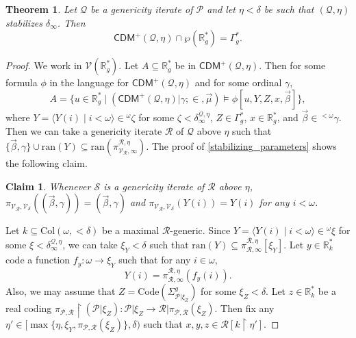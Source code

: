 \documentclass{amsart}
\newtheorem{thm}[dfn]{Theorem}
\newtheorem{claim}{Claim}[dfn]
\renewcommand{\subset}{\subseteq}
\newcommand{\power}{\wp}
\newcommand{\uphar}{\mathbin{\upharpoonright}}
\begin{document}
\begin{thm}\label{sets_of_reals_in_CDM_plus}
Let $\mathcal{Q}$ be a genericity iterate of $\mathcal{P}$ and 
let $\eta<\delta$ be such that $(\mathcal{Q}, \eta)$ stabilizes $\delta_{\infty}$.
Then
\[
\mathsf{CDM}^{+}(\mathcal{Q}, \eta)\cap\power(\mathbb{R}^*_g)=\Gamma^*_g.
\]
\end{thm}
\begin{proof}
We work in $\mathcal{V}(\mathbb{R}^*_g)$.
Let $A\subset\mathbb{R}^*_g$ be in $\mathsf{CDM}^{+}(\mathcal{Q}, \eta)$.
Then for some formula $\phi$ in the language for $\mathsf{CDM}^+(\mathcal{Q}, \eta)$ and for some ordinal $\gamma$,
\[
A=\{u\in\mathbb{R}^*_g\mid(\mathsf{CDM}^{+}(\mathcal{Q}, \eta)\vert\gamma; {\in}, \vec{\mu})\models\phi[u, Y, Z, x, \vec{\beta}]\},
\]
where $Y=\langle Y(i)\mid i<\omega\rangle\in {}^{\omega}\zeta$ for some $\zeta<\delta^{\mathcal{Q}, \eta}_{\infty}$, $Z\in\Gamma^*_g$, $x\in\mathbb{R}^*_g$, and $\vec{\beta}\in{}^{<\omega}\gamma$.
Then we can take a genericity iterate $\mathcal{R}$ of $\mathcal{Q}$ above $\eta$ such that $\{\vec{\beta}, \gamma\}\cup\mathrm{ran}(Y)\subset\mathrm{ran}(\pi^{\mathcal{R}, \eta}_{\mathcal{V}_{\mathcal{R}}, \infty})$.
The proof of \cref{stabilizing_parameters} shows the following claim.

\begin{claim}\label{stabilizing_parameters_1}
Whenever $\mathcal{S}$ is a genericity iterate of $\mathcal{R}$ above $\eta$, $\pi_{\mathcal{V}_{\mathcal{R}}, \mathcal{V}_{\mathcal{S}}}((\vec{\beta}, \gamma))=(\vec{\beta}, \gamma)$ and $\pi_{\mathcal{V}_{\mathcal{R}}, \mathcal{V}_{\mathcal{S}}}(Y(i))=Y(i)$ for any $i<\omega$.
\end{claim}

Let $k\subset\mathrm{Col}(\omega, {<}\delta)$ be a maximal $\mathcal{R}$-generic.
Since $Y=\langle Y(i)\mid i<\omega\rangle\in {}^{\omega}\xi$ for some $\xi<\delta^{\mathcal{Q}, \eta}_{\infty}$, we can take $\xi_Y<\delta$ such that $\mathrm{ran}(Y)\subset\pi^{\mathcal{R}, \eta}_{\mathcal{R}, \infty}[\xi_Y]$.
Let $y\in\mathbb{R}^*_{k}$ code a function $f_y\colon\omega\to\xi_Y$ such that for any $i\in\omega$,
\[
Y(i)=\pi^{\mathcal{R}, \eta}_{\mathcal{R}, \infty}(f_y(i)).
\]
Also, we may assume that $Z=\mathrm{Code}(\Sigma^g_{\mathcal{P}\vert\xi_Z})$ for some $\xi_Z<\delta$.
Let $z\in\mathbb{R}^*_k$ be a real coding $\pi_{\mathcal{P}, \mathcal{R}}\uphar(\mathcal{P}\vert\xi_Z)\colon\mathcal{P}\vert\xi_Z\to\mathcal{R}\vert\pi_{\mathcal{P}, \mathcal{R}}(\xi_Z)$.
Then fix any $\eta'\in[\max\{\eta, \xi_Y, \pi_{\mathcal{P}, \mathcal{R}}(\xi_Z)\}, \delta)$ such that $x, y, z\in\mathcal{R}[k\uphar\eta']$.


\end{proof}
\end{document}
